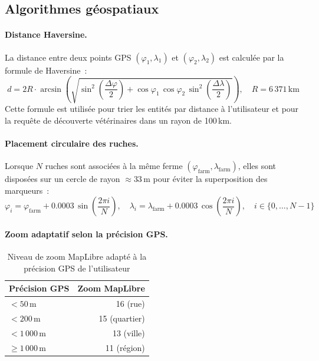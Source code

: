 \subsection{Algorithmes géospatiaux}

\paragraph{Distance Haversine.}
La distance entre deux points GPS $(\varphi_1, \lambda_1)$ et $(\varphi_2, \lambda_2)$
est calculée par la formule de Haversine~:
\begin{equation}
d = 2R \cdot \arcsin\!\left(\sqrt{\sin^2\!\!\left(\frac{\Delta\varphi}{2}\right)
  + \cos\varphi_1\,\cos\varphi_2\,\sin^2\!\!\left(\frac{\Delta\lambda}{2}\right)}
  \right), \quad R = 6\,371\,\text{km}
\label{eq:haversine}
\end{equation}
Cette formule est utilisée pour trier les entités par distance à l'utilisateur et
pour la requête de découverte vétérinaires dans un rayon de 100\,km.

\paragraph{Placement circulaire des ruches.}
Lorsque $N$ ruches sont associées à la même ferme
$(\varphi_\text{farm},\lambda_\text{farm})$, elles sont disposées sur un cercle
de rayon $\approx 33$\,m pour éviter la superposition des marqueurs~:
\begin{equation}
\varphi_i = \varphi_\text{farm} + 0.0003\,\sin\!\left(\frac{2\pi i}{N}\right),\quad
\lambda_i = \lambda_\text{farm} + 0.0003\,\cos\!\left(\frac{2\pi i}{N}\right),\quad
i \in \{0,\ldots,N-1\}
\label{eq:circular_hive}
\end{equation}

\paragraph{Zoom adaptatif selon la précision GPS.}

\begin{table}[H]
\centering
\caption{Niveau de zoom MapLibre adapté à la précision GPS de l'utilisateur}
\label{tab:gps_zoom}
\begin{tabular}{lr}
\toprule
\textbf{Précision GPS} & \textbf{Zoom MapLibre} \\
\midrule
$< 50$\,m   & 16 (rue) \\
$< 200$\,m  & 15 (quartier) \\
$< 1\,000$\,m & 13 (ville) \\
$\geq 1\,000$\,m & 11 (région) \\
\bottomrule
\end{tabular}
\end{table}

